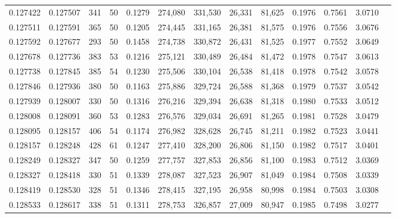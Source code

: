 \begin{tabular}{rrrrrrrrrrrrr}
0.127422 & 0.127507 &   341 &  50 &                                     0.1279 & 274,080 & 331,530 &  26,331 &  81,625 & 0.1976 & 0.7561 & 3.0710 \\
0.127511 & 0.127591 &   365 &  50 &                                     0.1205 & 274,445 & 331,165 &  26,381 &  81,575 & 0.1976 & 0.7556 & 3.0676 \\
0.127592 & 0.127677 &   293 &  50 &                                     0.1458 & 274,738 & 330,872 &  26,431 &  81,525 & 0.1977 & 0.7552 & 3.0649 \\
0.127678 & 0.127736 &   383 &  53 &                                     0.1216 & 275,121 & 330,489 &  26,484 &  81,472 & 0.1978 & 0.7547 & 3.0613 \\
0.127738 & 0.127845 &   385 &  54 &                                     0.1230 & 275,506 & 330,104 &  26,538 &  81,418 & 0.1978 & 0.7542 & 3.0578 \\
0.127846 & 0.127936 &   380 &  50 &                                     0.1163 & 275,886 & 329,724 &  26,588 &  81,368 & 0.1979 & 0.7537 & 3.0542 \\
0.127939 & 0.128007 &   330 &  50 &                                     0.1316 & 276,216 & 329,394 &  26,638 &  81,318 & 0.1980 & 0.7533 & 3.0512 \\
0.128008 & 0.128091 &   360 &  53 &                                     0.1283 & 276,576 & 329,034 &  26,691 &  81,265 & 0.1981 & 0.7528 & 3.0479 \\
0.128095 & 0.128157 &   406 &  54 &                                     0.1174 & 276,982 & 328,628 &  26,745 &  81,211 & 0.1982 & 0.7523 & 3.0441 \\
0.128157 & 0.128248 &   428 &  61 &                                     0.1247 & 277,410 & 328,200 &  26,806 &  81,150 & 0.1982 & 0.7517 & 3.0401 \\
0.128249 & 0.128327 &   347 &  50 &                                     0.1259 & 277,757 & 327,853 &  26,856 &  81,100 & 0.1983 & 0.7512 & 3.0369 \\
0.128327 & 0.128418 &   330 &  51 &                                     0.1339 & 278,087 & 327,523 &  26,907 &  81,049 & 0.1984 & 0.7508 & 3.0339 \\
0.128419 & 0.128530 &   328 &  51 &                                     0.1346 & 278,415 & 327,195 &  26,958 &  80,998 & 0.1984 & 0.7503 & 3.0308 \\
0.128533 & 0.128617 &   338 &  51 &                                     0.1311 & 278,753 & 326,857 &  27,009 &  80,947 & 0.1985 & 0.7498 & 3.0277 \\

\end{tabular}
